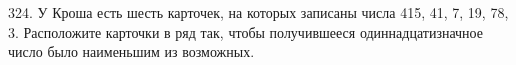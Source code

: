 324. У Кроша есть шесть карточек, на которых записаны числа 415, 41, 7, 19, 78, 3. Расположите карточки в ряд так, чтобы получившееся одиннадцатизначное число было наименьшим из возможных.\\
